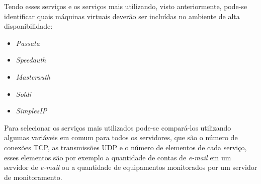 Tendo esses serviços e os serviços mais utilizando, visto anteriormente, pode-se identificar quais máquinas virtuais deverão ser incluídas no 
ambiente de alta disponibilidade:
\begin{itemize}
 \item \textit{Passata}
 \item \textit{Speedauth}
 \item \textit{Masterauth}
 \item \textit{Soldi}
 \item \textit{SimplesIP}
\end{itemize}

Para selecionar os serviços mais utilizados pode-se compará-los utilizando algumas variáveis em comum para todos os servidores, que são o número 
de conexões \ac{TCP}, as transmissões \ac{UDP} e o número de elementos de cada serviço, esses elementos são por exemplo a quantidade de 
contas de \textit{e-mail} em um servidor de \textit{e-mail} ou a quantidade de equipamentos monitorados por um servidor de monitoramento. 
% 

